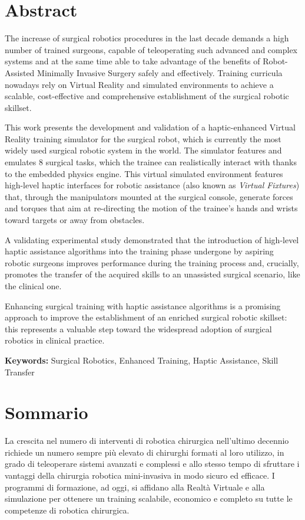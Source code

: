 \documentclass[../main.tex]{subfiles}
\begin{document}
\chapter*{Abstract}
The increase of surgical robotics procedures in the last decade demands a high number of trained surgeons, capable of teleoperating such advanced and complex systems and at the same time able to take advantage of the benefits of Robot-Assisted Minimally Invasive Surgery safely and effectively. Training curricula nowadays rely on Virtual Reality and simulated environments to achieve a scalable, cost-effective and comprehensive establishment of the surgical robotic skillset.

This work presents the development and validation of a haptic-enhanced Virtual Reality training simulator for the \davinci surgical robot, which is currently the most widely used surgical robotic system in the world. The simulator features and emulates 8 surgical tasks, which the trainee can realistically interact with thanks to the embedded physics engine. This virtual simulated environment features high-level haptic interfaces for robotic assistance (also known as \textit{Virtual Fixtures}) that, through the manipulators mounted at the surgical console, generate forces and torques that aim at re-directing the motion of the trainee's hands and wrists toward targets or away from obstacles. 

A validating experimental study demonstrated that the introduction of high-level haptic assistance algorithms into the training phase undergone by aspiring robotic surgeons improves performance during the training process and, crucially, promotes the transfer of the acquired skills to an unassisted surgical scenario, like the clinical one. 

Enhancing surgical training with haptic assistance algorithms is a promising approach to improve the establishment of an enriched surgical robotic skillset: this represents a valuable step toward the widespread adoption of surgical robotics in clinical practice.

\textbf{Keywords:} Surgical Robotics, Enhanced Training, Haptic Assistance, Skill Transfer

\newpage\newpage
{}
\chapter*{Sommario}
La crescita nel numero di interventi di robotica chirurgica nell'ultimo decennio richiede un numero sempre più elevato di chirurghi formati al loro utilizzo, in grado di teleoperare sistemi avanzati e complessi e allo stesso tempo di sfruttare i vantaggi della chirurgia robotica mini-invasiva in modo sicuro ed efficace. I programmi di formazione, ad oggi, si affidano alla Realtà Virtuale e alla simulazione per ottenere un training scalabile, economico e completo su tutte le competenze di robotica chirurgica.
\end{document}
